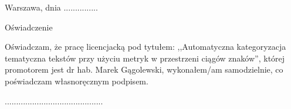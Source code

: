 \documentclass[12pt, twoside, openany]{report}
\theoremstyle{plain}
\begin{document}


\clearpage
\pagestyle{empty}
\noindent Warszawa, dnia ...............
\vspace{5cm}
\begin{center}
\LARGE{Oświadczenie}
\end{center}
Oświadczam, że pracę licencjacką pod tytułem: ,,Automatyczna kategoryzacja tematyczna tekstów przy użyciu metryk w przestrzeni ciągów znaków'', której promotorem jest dr hab. Marek Gągolewski, wykonałem/am samodzielnie, co poświadczam własnoręcznym podpisem.
\vspace{2cm}
\begin{flushright}
...........................................
\end{flushright}
\end{document}

